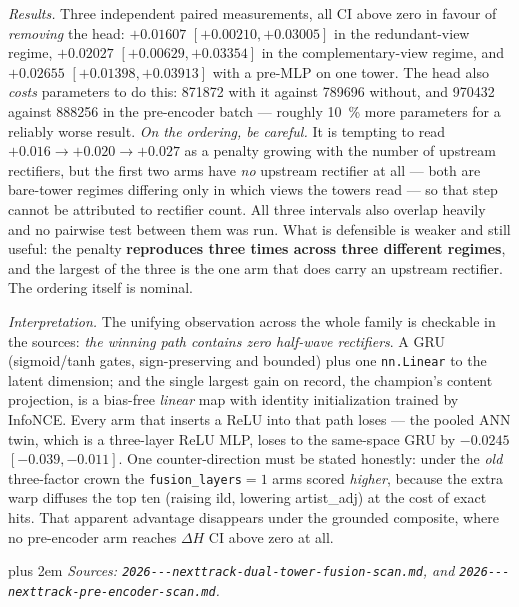 \documentclass[11pt]{article}
\begin{document}
\emph{Results.} Three independent paired measurements, all CI above zero in
favour of \emph{removing} the head: $+\num{0.01607}$
$[+\num{0.00210},+\num{0.03005}]$ in the redundant-view regime, $+\num{0.02027}$
$[+\num{0.00629},+\num{0.03354}]$ in the complementary-view regime, and
$+\num{0.02655}$ $[+\num{0.01398},+\num{0.03913}]$ with a pre-MLP on one tower.
The head also \emph{costs} parameters to do this: \num{871872} with it against
\num{789696} without, and \num{970432} against \num{888256} in the pre-encoder
batch --- roughly \SI{10}{\percent} more parameters for a reliably worse result.
\emph{On the ordering, be careful.} It is tempting to read
$+\num{0.016}\to+\num{0.020}\to+\num{0.027}$ as a penalty growing with the number
of upstream rectifiers, but the first two arms have \emph{no} upstream rectifier
at all --- both are bare-tower regimes differing only in which views the towers
read --- so that step cannot be attributed to rectifier count. All three
intervals also overlap heavily and no pairwise test between them was run. What is
defensible is weaker and still useful: the penalty \textbf{reproduces three times
across three different regimes}, and the largest of the three is the one arm that
does carry an upstream rectifier. The ordering itself is nominal.

\emph{Interpretation.} The unifying observation across the whole family is
checkable in the sources: \emph{the winning path contains zero half-wave
rectifiers}. A GRU (sigmoid/tanh gates, sign-preserving and bounded) plus one
\texttt{nn.Linear} to the latent dimension; and the single largest gain on
record, the champion's content projection, is a bias-free \emph{linear} map with
identity initialization trained by InfoNCE. Every arm that inserts a ReLU into
that path loses --- the pooled ANN twin, which is a three-layer ReLU MLP, loses
to the same-space GRU by $-\num{0.0245}$ $[-\num{0.039},-\num{0.011}]$. One
counter-direction must be stated honestly: under the \emph{old} three-factor
crown the \texttt{fusion\_layers}${}=1$ arms scored \emph{higher}, because the
extra warp diffuses the top ten (raising ild, lowering artist\_adj) at the cost
of exact hits. That apparent advantage disappears under the grounded composite,
where no pre-encoder arm reaches $\Delta H$ CI above zero at all.

{\rightskip=0pt plus 2em \emph{Sources: \texttt{2026---\allowbreak nexttrack-\allowbreak dual-\allowbreak tower-\allowbreak fusion-\allowbreak scan.md},
and \texttt{2026---\allowbreak nexttrack-\allowbreak pre-\allowbreak encoder-\allowbreak scan.md}.}\par}
\end{document}
